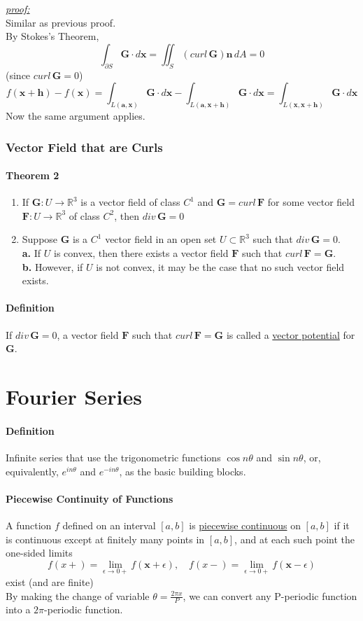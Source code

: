 \documentclass[11pt]{article}
\newcommand{\tb}[1]{\textbf{#1}}
\newcommand{\real}[0]{\mathbb{R}}
\newcommand{\under}[1]{\underline{#1}}
\newcommand{\proof}[0]{\textit{\underline{proof:} }}
\newcommand{\vx}[0]{\tb{x}}
\newcommand{\va}[0]{\tb{a}}
\newcommand{\vf}[0]{\tb{F}}
\newcommand{\vg}[0]{\tb{G}}
\newcommand{\vn}[0]{\tb{n}}
\begin{document}
\noindent \proof \\
Similar as previous proof.\\
By Stokes's Theorem, $$\int_{\partial S}\vg \cdot d\vx = \iint_S(curl\, \vg)\vn \,dA = 0$$ (since $curl \,\vg = 0$)
$$f(\vx + \tb{h}) - f(\vx) = \int_{L(\va, \vx)}\vg\cdot d\vx - \int_{L(\va, \vx + \tb{h})} \vg \cdot d\vx = \int_{L(\vx,\vx+\tb{h})}\vg\cdot d\vx$$
Now the same argument applies.


\subsubsection{Vector Field that are Curls}
\paragraph{Theorem 2}
\begin{enumerate}
	\item If $\vg: U \rightarrow \real^3$ is a vector field of class $C^1$ and $\vg = curl\,\vf$ for some vector field $\vf: U \rightarrow \real^3$ of class $C^2$, then $div\,\vg = 0$
	\item Suppose $\vg$ is a $C^1$ vector field in an open set $U \subset \real^3$ such that $div \, \vg = 0$. \\
	\tb{a.} If $U$ is convex, then there exists a vector field $\vf$ such that $curl \, \vf = \vg$. \\
	\tb{b.} However, if $U$ is not convex, it may be the case that no such vector field exists.
\end{enumerate}
\paragraph{Definition} If $div \,\vg = 0$, a vector field $\vf$ such that $curl \,\vf = \vg$ is called a \under{vector potential} for $\vg$.




\section{Fourier Series}
\paragraph{Definition} Infinite series that use the trigonometric functions $\cos n\theta$ and $\sin n\theta$, or, equivalently, $e^{in\theta}$ and $e^{-in\theta}$, as the basic building blocks.
\paragraph{Piecewise Continuity of Functions} A function $f$ defined on an interval $[a,b]$ is \under{piecewise continuous} on $[a,b]$ if it is continuous except at finitely many points in $[a,b]$, and at each such point the one-sided limits
$$f(x+) = \underset{\epsilon \rightarrow 0+}{\lim} f(\vx + \epsilon), \quad f(x-)=\underset{\epsilon \rightarrow 0+}{\lim} f(\vx - \epsilon)$$
exist (and are finite)\\
By making the change of variable $\theta = \frac{2\pi x}{P}$, we can convert any P-periodic function into a $2\pi$-periodic function. 
\end{document}
